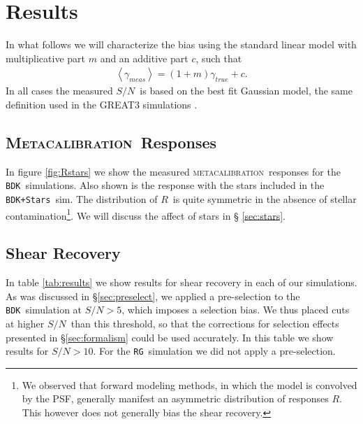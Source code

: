 \documentclass[iop]{emulateapj}
\newcommand{\snr}{$S/N$}
\newcommand{\mcal}{\textsc{metacalibration}}
\newcommand{\Mcal}{\textsc{Metacalibration}}
\newcommand{\mcalR}{\mbox{\boldmath $R$}}
\newcommand{\bdsim}{\texttt{BDK}}
\newcommand{\bdstar}{\texttt{BDK+Stars}}
\newcommand{\rgsim}{\texttt{RG}}
\begin{document}
\section{Results} \label{sec:results}

In what follows we will characterize the bias using the standard linear model
\citep[e.g.][]{great3} with multiplicative part $m$ and an additive part $c$,
such that
\begin{align}
	\left< \gamma_{meas} \right> = (1+m) \gamma_{true} + c.
\end{align}
In all cases the measured \snr\ is based on the best fit Gaussian model, the
same definition used in the GREAT3 simulations \citep{great3}.

\subsection{\Mcal\ Responses}

In figure \ref{fig:Rstars} we show the measured \mcal\ responses for the
\bdsim\  simulations.  Also shown is the response with the stars included in
the \bdstar\ sim.  The distribution of \mcalR\ is quite symmetric in the
absence of stellar contamination\footnote{We observed that forward modeling
methods, in which the model is convolved by the PSF, generally manifest
an asymmetric distribution of responses \mcalR. This however does not
generally bias the shear recovery.}.  We will discuss the affect of stars in \S
\ref{sec:stars}.


\subsection{Shear Recovery} \label{sec:shear_recover}


In table \ref{tab:results} we show results for shear recovery in each of our
simulations.  As was discussed in \S \ref{sec:preselect}, we applied a
pre-selection to the \bdsim\ simulation at \snr$ > 5$, which imposes a
selection bias.  We thus placed cuts at higher \snr\ than this threshold, so
that the corrections for selection effects presented in \S \ref{sec:formalism}
could be used accurately.  In this table we show results for \snr$ > 10$.  For
the \rgsim\ simulation we did not apply a pre-selection.
\end{document}
